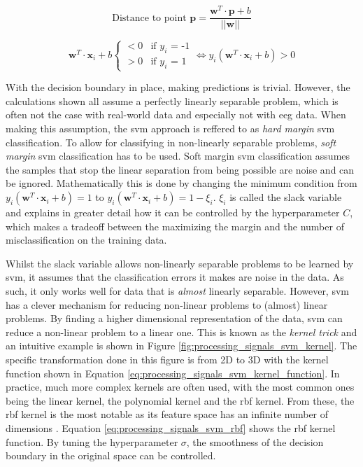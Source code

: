 \begin{equation}
    \label{eq:processing_signals_svm_point_distance}
    \text{Distance to point } \mathbf{p} = \frac{\mathbf{w}^T \cdot \mathbf{p} + b}{||\mathbf{w}||}
\end{equation}

\begin{equation}
    \label{eq:processing_signals_svm_rules}
    \mathbf{w}^T \cdot \mathbf{x}_i + b 
    \begin{cases}
          < 0 & \text{if $y_i$ = -1} \\
          > 0 & \text{if $y_i$ = 1}
    \end{cases}
    \Longleftrightarrow y_i (\mathbf{w}^T \cdot \mathbf{x}_i + b) > 0
\end{equation}

With the decision boundary in place, making predictions is trivial.
However, the calculations shown all assume a perfectly linearly separable problem, which is often not the case with real-world data and especially not with \gls{eeg} data.
When making this assumption, the \gls{svm} approach is reffered to as \textit{hard margin} \gls{svm} classification.
To allow for classifying in non-linearly separable problems, \textit{soft margin} \gls{svm} classification has to be used.
Soft margin \gls{svm} classification assumes the samples that stop the linear separation from being possible are noise and can be ignored.
Mathematically this is done by changing the minimum condition from $y_i (\mathbf{w}^T \cdot \mathbf{x}_i + b) = 1$ to $y_i (\mathbf{w}^T \cdot \mathbf{x}_i + b) = 1 - \xi_i$.
$\xi_i$ is called the slack variable and \citet{svm_explained} explains in greater detail how it can be controlled by the hyperparameter $C$, which makes a tradeoff between the maximizing the margin and the number of misclassification on the training data.

Whilst the slack variable allows non-linearly separable problems to be learned by \gls{svm}, it assumes that the classification errors it makes are noise in the data.
As such, it only works well for data that is \textit{almost} linearly separable.
However, \gls{svm} has a clever mechanism for reducing non-linear problems to (almost) linear problems.
By finding a higher dimensional representation of the data, \gls{svm} can reduce a non-linear problem to a linear one.
This is known as the \textit{kernel trick} and an intuitive example is shown in Figure \ref{fig:processing_signals_svm_kernel}.
The specific transformation done in this figure is from 2D to 3D with the kernel function shown in Equation \ref{eq:processing_signals_svm_kernel_function}.
In practice, much more complex kernels are often used, with the most common ones being the linear kernel, the polynomial kernel and the \gls{rbf} kernel.
From these, the \gls{rbf} kernel is the most notable as its feature space has an infinite number of dimensions \citep{ml_book}.
Equation \ref{eq:processing_signals_svm_rbf} shows the \gls{rbf} kernel function.
By tuning the hyperparameter $\sigma$, the smoothness of the decision boundary in the original space can be controlled.


